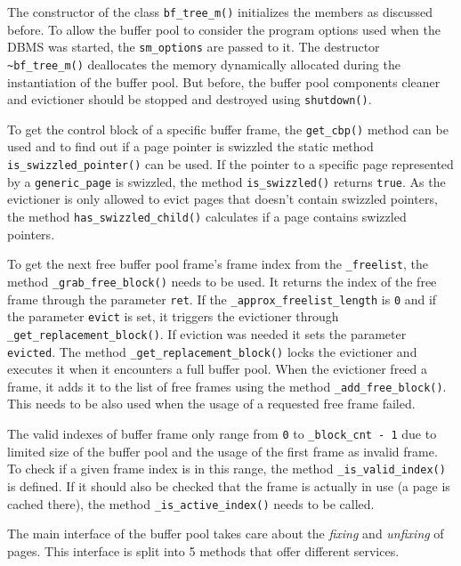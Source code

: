 	The constructor of the class \lstinline{bf_tree_m()} initializes the members as discussed before. To allow the buffer pool to consider the program options used when the DBMS was started, the \lstinline{sm_options} are passed to it. The destructor \lstinline{~bf_tree_m()} deallocates the memory dynamically allocated during the instantiation of the buffer pool. But before, the buffer pool components cleaner and evictioner should be stopped and destroyed using \lstinline{shutdown()}.

	To get the control block of a specific buffer frame, the \lstinline{get_cbp()} method can be used and to find out if a page pointer is swizzled the static method \lstinline{is_swizzled_pointer()} can be used. If the pointer to a specific page represented by a \lstinline{generic_page} is swizzled, the method \lstinline{is_swizzled()} returns \lstinline{true}. As the evictioner is only allowed to evict pages that doesn't contain swizzled pointers, the method \lstinline{has_swizzled_child()} calculates if a page contains swizzled pointers.

	To get the next free buffer pool frame's frame index from the \lstinline{_freelist}, the method \lstinline{_grab_free_block()} needs to be used. It returns the index of the free frame through the parameter \lstinline{ret}. If the \lstinline{_approx_freelist_length} is \lstinline{0} and if the parameter \lstinline{evict} is set, it triggers the evictioner through \lstinline{_get_replacement_block()}. If eviction was needed it sets the parameter \lstinline{evicted}. The method \lstinline{_get_replacement_block()} locks the evictioner and executes it when it encounters a full buffer pool. When the evictioner freed a frame, it adds it to the list of free frames using the method \lstinline{_add_free_block()}. This needs to be also used when the usage of a requested free frame failed.

	The valid indexes of buffer frame only range from \lstinline{0} to \lstinline{_block_cnt - 1} due to limited size of the buffer pool and the usage of the first frame as invalid frame. To check if a given frame index is in this range, the method \lstinline{_is_valid_index()} is defined. If it should also be checked that the frame is actually in use (a page is cached there), the method \lstinline{_is_active_index()} needs to be called.

	The main interface of the buffer pool takes care about the \emph{fixing} and \emph{unfixing} of pages. This interface is split into 5 methods that offer different services.

